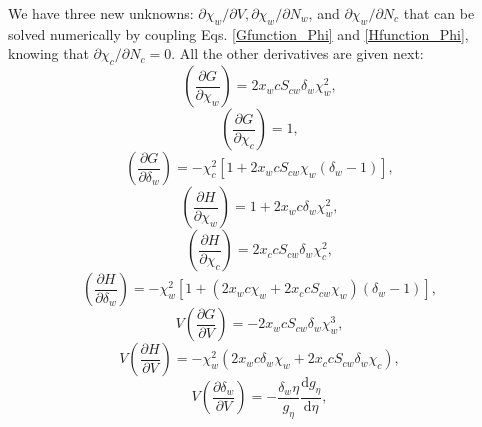 We have three new unknowns: $\partial \chi_w / \partial V, \partial \chi_w / \partial N_w$, and  $\partial \chi_w / \partial N_c$ that can be solved numerically by coupling Eqs. \ref{Gfunction_Phi} and \ref{Hfunction_Phi}, knowing that
$\partial \chi_c / \partial N_c = 0$. All the other derivatives are given next:
\begin{equation}
        \left ( \frac{\partial G}{\partial \chi_w} \right ) = 2 x_w c S_{cw} \delta_w \chi_w^2,
        \label{dGdchiw}
\end{equation} 
\begin{equation}
        \left ( \frac{\partial G}{\partial \chi_c} \right ) = 1,
        \label{dGdchic}
\end{equation} 
\begin{equation}
        \left ( \frac{\partial G}{\partial \delta_w} \right ) = -\chi_c^2 \left [  1 + 2x_w c S_{cw} \chi_w \left ( \delta_w - 1\right ) \right ],
        \label{dGddelta}
\end{equation} 
\begin{equation}
        \left ( \frac{\partial H}{\partial \chi_w} \right ) = 1 + 2 x_w c \delta_w \chi_w^2,
        \label{dHdchiw}
\end{equation} 
\begin{equation}
        \left ( \frac{\partial H}{\partial \chi_c} \right ) = 2 x_c c S_{cw} \delta_w \chi_c^2,
        \label{dHdchic}
\end{equation} 
\begin{equation}
        \left ( \frac{\partial H}{\partial \delta_w} \right ) = -\chi_w^2 \left [  1 + \left ( 2x_w c \chi_w + 2x_c c S_{cw} \chi_w \right ) \left ( \delta_w - 1\right ) \right ],
        \label{dHddelta}
\end{equation} 
\begin{equation}
        V\left ( \frac{\partial G}{\partial V} \right ) =-2 x_w c S_{cw} \delta_w \chi_w^3,
        \label{VdGdV}
\end{equation} 
\begin{equation}
        V\left ( \frac{\partial H}{\partial V} \right ) =-\chi_w^2 \left ( 2 x_w c \delta_w \chi_w +  2 x_c c S_{cw} \delta_w \chi_c \right ),
        \label{VdHdV}
\end{equation} 
\begin{equation}
        V\left ( \frac{\partial \delta_w}{\partial V} \right ) =-  \frac{\delta_w \eta}{g_\eta} \frac{\mathrm{d} g_\eta} {\mathrm{d} \eta},
        \label{VddeltadV}
\end{equation} 
